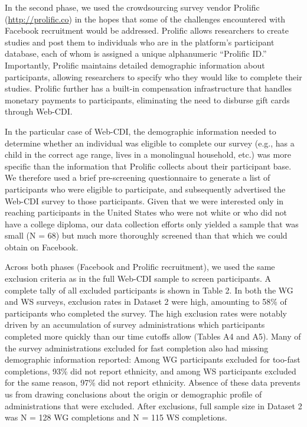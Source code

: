 \documentclass[
  english,
  ,man,floatsintext]{apa6}
\begin{document}
In the second phase, we used the crowdsourcing survey vendor Prolific (\url{http://prolific.co}) in the hopes that some of the challenges encountered with Facebook recruitment would be addressed. Prolific allows researchers to create studies and post them to individuals who are in the platform's participant database, each of whom is assigned a unique alphanumeric ``Prolific ID.'' Importantly, Prolific maintains detailed demographic information about participants, allowing researchers to specify who they would like to complete their studies. Prolific further has a built-in compensation infrastructure that handles monetary payments to participants, eliminating the need to disburse gift cards through Web-CDI.

In the particular case of Web-CDI, the demographic information needed to determine whether an individual was eligible to complete our survey (e.g., has a child in the correct age range, lives in a monolingual household, etc.) was more specific than the information that Prolific collects about their participant base. We therefore used a brief pre-screening questionnaire to generate a list of participants who were eligible to participate, and subsequently advertised the Web-CDI survey to those participants. Given that we were interested only in reaching participants in the United States who were not white or who did not have a college diploma, our data collection efforts only yielded a sample that was small (N = 68) but much more thoroughly screened than that which we could obtain on Facebook.

Across both phases (Facebook and Prolific recruitment), we used the same exclusion criteria as in the full Web-CDI sample to screen participants. A complete tally of all excluded participants is shown in Table 2. In both the WG and WS surveys, exclusion rates in Dataset 2 were high, amounting to 58\% of participants who completed the survey. The high exclusion rates were notably driven by an accumulation of survey administrations which participants completed more quickly than our time cutoffs allow (Tables A4 and A5). Many of the survey administrations excluded for fast completion also had missing demographic information reported: Among WG participants excluded for too-fast completions, 93\% did not report ethnicity, and among WS participants excluded for the same reason, 97\% did not report ethnicity. Absence of these data prevents us from drawing conclusions about the origin or demographic profile of administrations that were excluded. After exclusions, full sample size in Dataset 2 was N = 128 WG completions and N = 115 WS completions.
\end{document}
